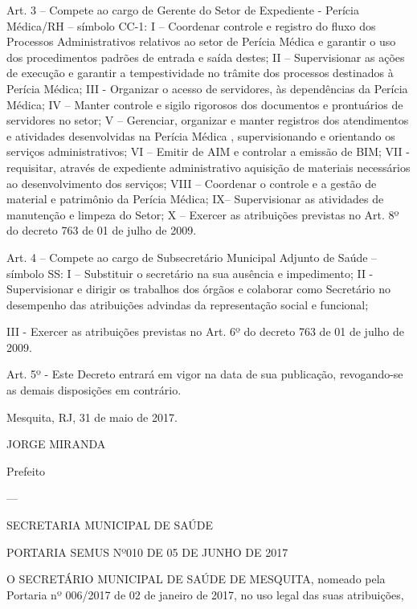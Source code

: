 \documentclass{doliberto}
\begin{document}
Art. 3 – Compete ao cargo de Gerente do Setor de Expediente 
- Perícia Médica/RH – símbolo CC-1: 
I  –  Coordenar  controle  e  registro  do  fluxo  dos  Processos 
Administrativos  relativos  ao  setor  de  Perícia  Médica  e 
garantir  o  uso  dos  procedimentos  padrões  de  entrada  e 
saída destes; 
II  –  Supervisionar  as  ações  de  execução  e  garantir  a 
tempestividade  no  trâmite  dos  processos  destinados  à 
Perícia Médica; 
III  -  Organizar  o  acesso  de  servidores,  às  dependências  da 
Perícia Médica; 
IV  –  Manter  controle  e  sigilo  rigorosos  dos  documentos  e 
prontuários de servidores no setor; 
V  –  Gerenciar,  organizar  e  manter  registros  dos 
atendimentos e atividades desenvolvidas na Perícia Médica , 
supervisionando e orientando os serviços administrativos; 
VI – Emitir de AIM e controlar a emissão de BIM; 
VII  -  requisitar,  através  de  expediente  administrativo 
aquisição de materiais necessários ao desenvolvimento dos 
serviços; 
VIII  –  Coordenar  o  controle  e  a  gestão  de  material  e 
patrimônio da Perícia Médica; 
IX– Supervisionar as atividades de manutenção e limpeza do 
Setor; 
X – Exercer as atribuições previstas no Art. 8º do decreto 763 
de 01 de julho de 2009. 
 
Art.  4  –  Compete  ao  cargo  de  Subsecretário  Municipal 
Adjunto de Saúde – símbolo SS: 
I – Substituir o secretário na sua ausência e impedimento; 
II  -   Supervisionar  e  dirigir  os  trabalhos  dos  órgãos  e 
colaborar como Secretário no desempenho das atribuições 
advindas da representação social e funcional; 


III  -  Exercer  as  atribuições  previstas  no  Art.  6º  do  decreto 
763 de 01 de julho de 2009. 
  
Art.  5º  -  Este  Decreto  entrará  em  vigor  na  data  de  sua 
publicação,  revogando-se  as  demais  disposições  em 
contrário. 
 

Mesquita, RJ, 31 de maio de 2017. 

 

JORGE MIRANDA 

Prefeito 

---

SECRETARIA MUNICIPAL DE SAÚDE 

PORTARIA SEMUS Nº010 DE 05 DE JUNHO DE 2017 

 
 
O  SECRETÁRIO  MUNICIPAL  DE  SAÚDE  DE  MESQUITA, 
nomeado  pela  Portaria  nº  006/2017  de  02  de  janeiro  de 
2017, no uso legal das suas atribuições, 
 
\end{document}

